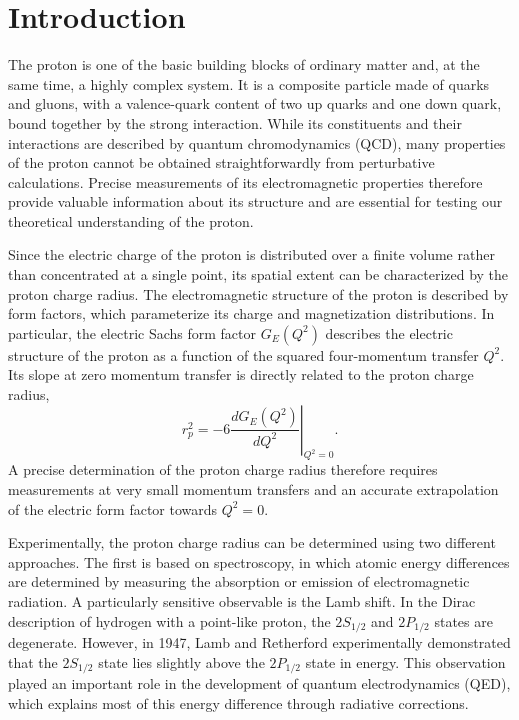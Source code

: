 \chapter{Introduction}\label{chap:Intro}


The proton is one of the basic building blocks of ordinary matter and, at the same time, a highly complex system. It is a composite particle made of quarks and gluons, with a valence-quark content of two up quarks and one down quark, bound together by the strong interaction. While its constituents and their interactions are described by quantum chromodynamics (QCD), many properties of the proton cannot be obtained straightforwardly from perturbative calculations. Precise measurements of its electromagnetic properties therefore provide valuable information about its structure and are essential for testing our theoretical understanding of the proton.

Since the electric charge of the proton is distributed over a finite volume rather than concentrated at a single point, its spatial extent can be characterized by the proton charge radius. The electromagnetic structure of the proton is described by form factors, which parameterize its charge and magnetization distributions. In particular, the electric Sachs form factor \(G_E(Q^2)\) describes the electric structure of the proton as a function of the squared four-momentum transfer \(Q^2\). Its slope at zero momentum transfer is directly related to the proton charge radius,
\[
r_p^2 =
-6
\left.
\frac{dG_E(Q^2)}{dQ^2}
\right|_{Q^2=0}.
\]
A precise determination of the proton charge radius therefore requires measurements at very small momentum transfers and an accurate extrapolation of the electric form factor towards \(Q^2=0\).

Experimentally, the proton charge radius can be determined using two different approaches. The first is based on spectroscopy, in which atomic energy differences are determined by measuring the absorption or emission of electromagnetic radiation. A particularly sensitive observable is the Lamb shift. In the Dirac description of hydrogen with a point-like proton, the \(2S_{1/2}\) and \(2P_{1/2}\) states are degenerate. However, in 1947, Lamb and Retherford experimentally demonstrated that the \(2S_{1/2}\) state lies slightly above the \(2P_{1/2}\) state in energy. This observation played an important role in the development of quantum electrodynamics (QED), which explains most of this energy difference through radiative corrections.

